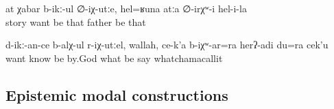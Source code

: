 \begin{exe}
	\ex	\label{ex:‎If you want stories, (here is one), she had such a father (and these were the stories about him)}
	\gll	at	χabar	b-ikː-ul	∅-iχ-utːe,	hel=ʁuna	atːa	∅-irχʷ-i	hel-i-la\\
			story	want	be	that	father	be	that\\
	\glt	{}

	\ex	\label{ex:‎If I would have known what you want, by God, I would also have said something}
	\gll	d-ikː-an-ce	b-alχ-ul	r-iχ-utːel,	wallah,	ce-k'a	b-iχʷ-ar=ra	herʔ-adi		du=ra	cek'u\\
		want	know	be	by.God	what	be	say		whatchamacallit\\
	\glt	{}
\end{exe}



\subsection{Epistemic modal constructions}
\label{ssec:Epistemic modal constructions}

